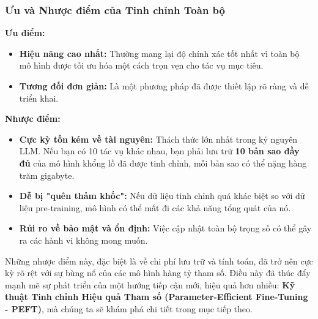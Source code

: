 \subsubsection{Ưu và Nhược điểm của Tinh chỉnh Toàn bộ}
\begin{tcolorbox}[
    title=Đánh giá Tinh chỉnh Toàn bộ (Full Fine-tuning),
    colback=blue!5!white, colframe=blue!75!black, fonttitle=\bfseries
]
\textbf{Ưu điểm:}
\begin{itemize}
    \item \textbf{Hiệu năng cao nhất:} Thường mang lại độ chính xác tốt nhất vì toàn bộ mô hình được tối ưu hóa một cách trọn vẹn cho tác vụ mục tiêu.
    \item \textbf{Tương đối đơn giản:} Là một phương pháp đã được thiết lập rõ ràng và dễ triển khai.
\end{itemize}
\textbf{Nhược điểm:}
\begin{itemize}
    \item \textbf{Cực kỳ tốn kém về tài nguyên:} Thách thức lớn nhất trong kỷ nguyên LLM. Nếu bạn có 10 tác vụ khác nhau, bạn phải lưu trữ \textbf{10 bản sao đầy đủ} của mô hình khổng lồ đã được tinh chỉnh, mỗi bản sao có thể nặng hàng trăm gigabyte.
    \item \textbf{Dễ bị "quên thảm khốc":} Nếu dữ liệu tinh chỉnh quá khác biệt so với dữ liệu pre-training, mô hình có thể mất đi các khả năng tổng quát của nó.
    \item \textbf{Rủi ro về bảo mật và ổn định:} Việc cập nhật toàn bộ trọng số có thể gây ra các hành vi không mong muốn.
\end{itemize}
\end{tcolorbox}

Những nhược điểm này, đặc biệt là về chi phí lưu trữ và tính toán, đã trở nên cực kỳ rõ rệt với sự bùng nổ của các mô hình hàng tỷ tham số. Điều này đã thúc đẩy mạnh mẽ sự phát triển của một hướng tiếp cận mới, hiệu quả hơn nhiều: \textbf{Kỹ thuật Tinh chỉnh Hiệu quả Tham số (Parameter-Efficient Fine-Tuning - PEFT)}, mà chúng ta sẽ khám phá chi tiết trong mục tiếp theo.